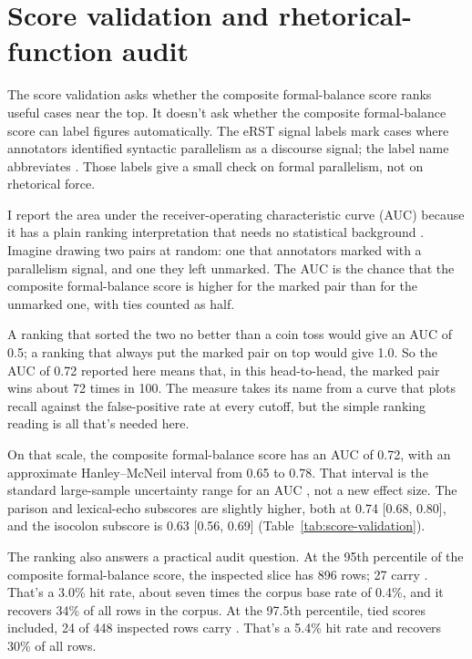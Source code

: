 \documentclass[12pt]{article}
\begin{document}
\FloatBarrier

\section{Score validation and rhetorical-function audit}

The score validation asks whether the composite formal-balance score ranks
useful cases near the top. It doesn't ask whether the composite formal-balance score can label
figures automatically. The eRST
 signal labels mark cases where annotators identified
syntactic parallelism as a discourse signal; the label name abbreviates
. Those labels give a small
check on formal parallelism, not on rhetorical force.

I report the area under the receiver-operating characteristic curve (AUC)
because it has a plain ranking interpretation that needs no statistical
background \citep{hanleyMcNeil1982ROCArea}. Imagine drawing two pairs at
random: one that annotators marked with a  parallelism
signal, and one they left unmarked. The AUC is the chance that the
composite formal-balance score is higher for the marked pair than for the
unmarked one, with ties counted as half.

A ranking that sorted the two no better than a coin toss would give an AUC
of 0.5; a ranking that always put the marked pair on top would give 1.0.
So the AUC of 0.72 reported here means that, in this head-to-head,
the marked pair wins about 72 times in 100. The measure takes its name from
a curve that plots recall against the false-positive rate at every cutoff,
but the simple ranking reading is all that's needed here.

On that scale, the composite formal-balance score has an AUC of 0.72, with an
approximate Hanley--McNeil interval from 0.65 to 0.78. That interval is the
standard large-sample uncertainty range for an AUC
\citep{hanleyMcNeil1982ROCArea}, not a new effect size. The parison and
lexical-echo subscores are slightly higher, both at 0.74 [0.68, 0.80], and
the isocolon subscore is 0.63 [0.56, 0.69]
(Table~\ref{tab:score-validation}).

The ranking also answers a practical audit question. At the 95th
percentile of the composite formal-balance score, the inspected slice has
896 rows; 27 carry . That's a 3.0\% hit rate, about seven
times the corpus base rate of 0.4\%, and it recovers 34\% of all
 rows in the corpus. At the 97.5th percentile, tied
scores included, 24 of 448 inspected rows carry . That's
a 5.4\% hit rate and recovers 30\% of all  rows.
\end{document}
